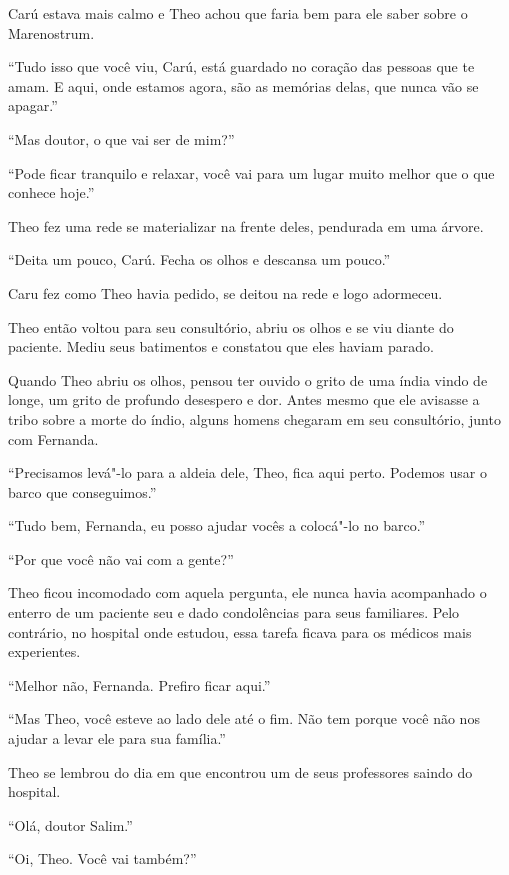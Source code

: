 Carú estava mais calmo e Theo achou que faria bem para ele saber sobre o
Marenostrum.

``Tudo isso que você viu, Carú, está guardado no coração das pessoas que
te amam. E aqui, onde estamos agora, são as memórias delas, que nunca
vão se apagar.''

``Mas doutor, o que vai ser de mim?''

``Pode ficar tranquilo e relaxar, você vai para um lugar muito melhor
que o que conhece hoje.''

Theo fez uma rede se materializar na frente deles, pendurada em uma
árvore.

``Deita um pouco, Carú. Fecha os olhos e descansa um pouco.''

Caru fez como Theo havia pedido, se deitou na rede e logo adormeceu.

Theo então voltou para seu consultório, abriu os olhos e se viu diante
do paciente. Mediu seus batimentos e constatou que eles haviam parado.

\asterisc


Quando Theo abriu os olhos, pensou ter
ouvido o grito de uma índia vindo de longe, um grito de profundo
desespero e dor. Antes mesmo que ele avisasse a tribo sobre a morte do
índio, alguns homens chegaram em seu consultório, junto com Fernanda.

``Precisamos levá"-lo para a aldeia dele, Theo, fica aqui perto. Podemos
usar o barco que conseguimos.''

``Tudo bem, Fernanda, eu posso ajudar vocês a colocá"-lo no barco.''

``Por que você não vai com a gente?''

Theo ficou incomodado com aquela pergunta, ele nunca havia acompanhado o
enterro de um paciente seu e dado condolências para seus familiares.
Pelo contrário, no hospital onde estudou, essa tarefa ficava para os
médicos mais experientes.

``Melhor não, Fernanda. Prefiro ficar aqui.''

``Mas Theo, você esteve ao lado dele até o fim. Não tem porque você não
nos ajudar a levar ele para sua família.''

Theo se lembrou do dia em que encontrou um de seus professores saindo do
hospital.

``Olá, doutor Salim.''

``Oi, Theo. Você vai também?''

